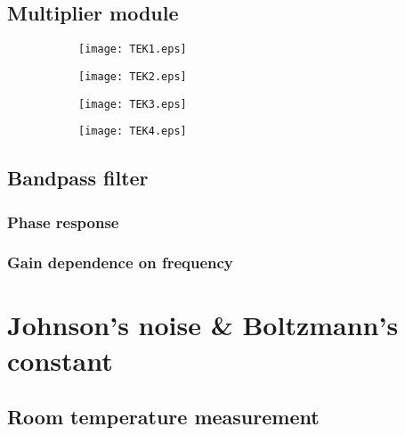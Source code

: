 \subsection{Multiplier module}

\begin{figure}[H]
	\centering
	\begin{subfigure}{0.49\textwidth}
		\centering
		\texttt{[image: TEK1.eps]}
	\end{subfigure}
	\begin{subfigure}{0.49\textwidth}
		\centering
		\texttt{[image: TEK2.eps]}
	\end{subfigure}
	
	\begin{subfigure}{0.49\textwidth}
		\centering
		\texttt{[image: TEK3.eps]}
	\end{subfigure}
	\begin{subfigure}{0.49\textwidth}
		\centering
		\texttt{[image: TEK4.eps]}
	\end{subfigure}
	
	\caption{}
	\label{fig:xy}
\end{figure}


\subsection{Bandpass filter}
\subsubsection{Phase response}

\subsubsection{Gain dependence on frequency}








\section{Johnson's noise \& Boltzmann's constant}

\subsection{Room temperature measurement}

